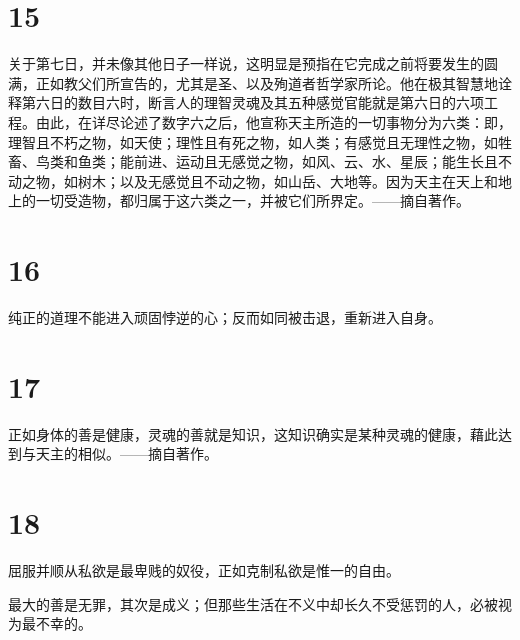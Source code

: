 \section{15}

关于第七日，并未像其他日子一样说，这明显是预指在它完成之前将要发生的圆满，正如教父们所宣告的，尤其是圣、以及殉道者哲学家所论。他在极其智慧地诠释第六日的数目六时，断言人的理智灵魂及其五种感觉官能就是第六日的六项工程。由此，在详尽论述了数字六之后，他宣称天主所造的一切事物分为六类：即，理智且不朽之物，如天使；理性且有死之物，如人类；有感觉且无理性之物，如牲畜、鸟类和鱼类；能前进、运动且无感觉之物，如风、云、水、星辰；能生长且不动之物，如树木；以及无感觉且不动之物，如山岳、大地等。因为天主在天上和地上的一切受造物，都归属于这六类之一，并被它们所界定。——摘自著作。\par


\section{16}

纯正的道理不能进入顽固悖逆的心；反而如同被击退，重新进入自身。\par


\section{17}

正如身体的善是健康，灵魂的善就是知识，这知识确实是某种灵魂的健康，藉此达到与天主的相似。——摘自著作。\par


\section{18}

屈服并顺从私欲是最卑贱的奴役，正如克制私欲是惟一的自由。\par

最大的善是无罪，其次是成义；但那些生活在不义中却长久不受惩罚的人，必被视为最不幸的。\par


